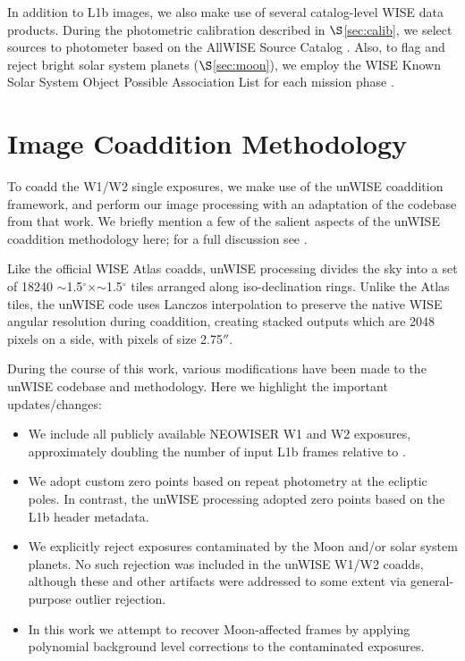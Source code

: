 \documentclass{emulateapj}
\begin{document}

In addition to L1b images, we also make use of several catalog-level WISE
data products. During the photometric calibration described in 
$\S$\ref{sec:calib}, we select sources to photometer based on the AllWISE 
Source Catalog \citep{cutri13}. Also, to flag and reject bright solar system 
planets ($\S$\ref{sec:moon}), we employ the WISE Known Solar System Object
Possible Association List for each mission phase 
\citep{cutri12, cutri13,cutri15}.

\section{Image Coaddition Methodology}
\label{sec:coadd}


To coadd the W1/W2 single exposures, we make use of the \cite{lang14}
unWISE coaddition framework, and perform our image processing with an 
adaptation of the codebase from that work. We briefly mention
a few of the salient aspects of the unWISE coaddition methodology here; for
a full discussion see \cite{lang14}.

Like the official WISE Atlas coadds, unWISE processing divides the sky
into a set of 18240 $\sim$1.5$^{\circ}$$\times$$\sim$1.5$^{\circ}$ tiles
arranged along iso-declination rings. Unlike the Atlas tiles, the
unWISE code uses Lanczos interpolation to preserve the native WISE 
angular resolution during coaddition, creating stacked outputs which are 2048 
pixels on a side, with pixels of size 2.75$''$.

During the course of this work, various modifications have been made to the
 unWISE codebase and methodology. Here we highlight the important 
updates/changes:

\begin{itemize}
\item We include all publicly available NEOWISER W1 and W2 exposures, 
approximately doubling the number of input L1b frames relative to \cite{lang14}.
\item We adopt custom zero points based on repeat photometry at the ecliptic 
poles. In contrast, the \cite{lang14} unWISE processing adopted zero points 
based on the L1b header metadata.
\item We explicitly reject exposures contaminated by the Moon and/or solar 
system planets. No such rejection was included in the \cite{lang14} unWISE 
W1/W2 coadds, although these and other artifacts were addressed to some extent 
via general-purpose outlier rejection.
\item In this work we attempt to recover Moon-affected frames by applying 
polynomial background level corrections to the contaminated exposures.
\end{itemize}
\end{document}
